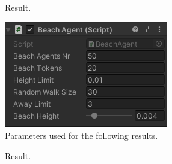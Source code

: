 \documentclass[12pt]{article}
\begin{document}
    \begin{figure}[H]
        \centering     %
        \caption{Result.}
        \label{fig:beachNotFlat}
    \end{figure}

    \begin{figure}[H]
        \centering
        \includegraphics[scale = 0.8]{images/Beach agent/Parameters 2}
        \caption{Parameters used for the following results.}
    \end{figure}

    \begin{figure}[H]
        \centering     %
        \caption{Result.}
        \label{fig:beachFlat}
    \end{figure}
\end{document}
